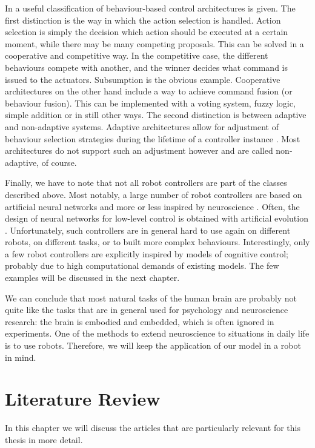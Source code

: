 \documentclass[10pt,a4paper]{report}
\begin{document}
In \citet{Scheutz2004} a useful classification of behaviour-based control architectures is given. The first distinction is the way in which the action selection is handled. Action selection is simply the decision which action should be executed at a certain moment, while there may be many competing proposals. This can be solved in a cooperative and competitive way. In the competitive case, the different behaviours compete with another, and the winner decides what command is issued to the actuators. Subsumption is the obvious example. Cooperative architectures on the other hand include a way to achieve command fusion (or behaviour fusion). This can be implemented with a voting system, fuzzy logic, simple addition or in still other ways. The second distinction is between adaptive and non-adaptive systems. Adaptive architectures allow for adjustment of behaviour selection strategies during the lifetime of a controller instance \citep{Wareham2011}. Most architectures do not support such an adjustment however and are called non-adaptive, of course. 

Finally, we have to note that not all robot controllers are part of the classes described above. Most notably, a large number of robot controllers are based on artificial neural networks and more or less inspired by neuroscience \citep{Lin1993, Erlhagen2006}. Often, the design of neural networks for low-level control is obtained with artificial evolution \citep{Floreano2000,Baldassarre2009,Fernandez-Leon2009}. Unfortunately, such controllers are in general hard to use again on different robots, on different tasks, or to built more complex behaviours. Interestingly, only a few robot controllers are explicitly inspired by models of cognitive control; probably due to high computational demands of existing models. The few examples will be discussed in the next chapter. 

We can conclude that most natural tasks of the human brain are probably not quite like the tasks that are in general used for psychology and neuroscience research: the brain is embodied and embedded, which is often ignored in experiments. One of the methods to extend neuroscience to situations in daily life is to use robots. Therefore, we will keep the application of our model in a robot in mind.

\chapter{Literature Review}
In this chapter we will discuss the articles that are particularly relevant for this thesis in more detail. 
\end{document}
